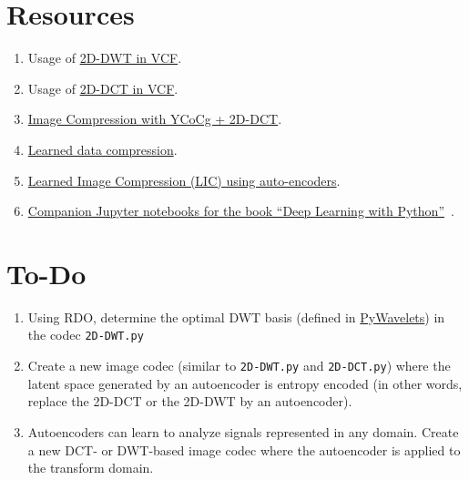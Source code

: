 \section{Resources}

\begin{enumerate}
\item Usage of \href{https://github.com/Sistemas-Multimedia/VCF/blob/main/notebooks/2D-DWT.ipynb}{2D-DWT in VCF}.
\item Usage of \href{https://github.com/Sistemas-Multimedia/VCF/blob/main/notebooks/2D-DCT.ipynb}{2D-DCT in VCF}.
\item
  \href{https://github.com/vicente-gonzalez-ruiz/DCT2D/blob/master/src/DCT2D/YCoCg_2D_DCT_SQ.ipynb}{Image
    Compression with YCoCg + 2D-DCT}.
\item
  \href{https://www.tensorflow.org/tutorials/generative/data_compression}{Learned
    data compression}.
\item
  \href{https://github.com/vicente-gonzalez-ruiz/learned_image_compression/blob/main/notebooks/LIC.ipynb}{Learned
    Image Compression (LIC) using auto-encoders}.
\item
  \href{https://github.com/fchollet/deep-learning-with-python-notebooks}{Companion
    Jupyter notebooks for the book ``Deep Learning with
    Python''}~\cite{chollet2021deep}.
\end{enumerate}


\section*{To-Do}

\begin{enumerate}
\item Using RDO, determine the optimal DWT basis (defined in
  \href{https://pywavelets.readthedocs.io/en/latest/}{PyWavelets}) in
  the codec \texttt{2D-DWT.py}
\item Create a new image codec (similar to \texttt{2D-DWT.py} and
  \texttt{2D-DCT.py}) where the latent space generated by an
  autoencoder is entropy encoded (in other words, replace the 2D-DCT
  or the 2D-DWT by an autoencoder).
\item Autoencoders can learn to analyze signals represented in any
  domain. Create a new DCT- or DWT-based image codec where the
  autoencoder is applied to the transform domain.
\end{enumerate}


